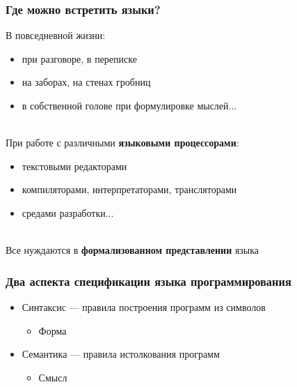 \documentclass{beamer}
\begin{document}
\begin{frame}[fragile]
  \transwipe[direction=90]
  \frametitle{Где можно встретить языки?}
  В повседневной жизни:
  \begin{itemize}
    \item при разговоре, в переписке
    \item на заборах, на стенах гробниц
    \item в собственной голове при формулировке мыслей...
  \end{itemize}
\pause ~\\
  При работе с различными \textbf{языковыми процессорами}:
  \begin{itemize}
    \item текстовыми редакторами
    \item компиляторами, интерпретаторами, трансляторами
    \item средами разработки...
  \end{itemize}
\pause ~\\
  Все нуждаются в \textbf{формализованном представлении} языка
\end{frame}

\begin{frame}[fragile]
  \transwipe[direction=90]
  \frametitle{Два аспекта спецификации языка программирования}
  \begin{itemize}
    \item Синтаксис --- правила построения программ из символов
    \begin{itemize}
      \item Форма
    \end{itemize}
    \item Семантика --- правила истолкования программ
    \begin{itemize}
      \item Смысл
    \end{itemize}
  \end{itemize}
\end{frame}
\end{document}
